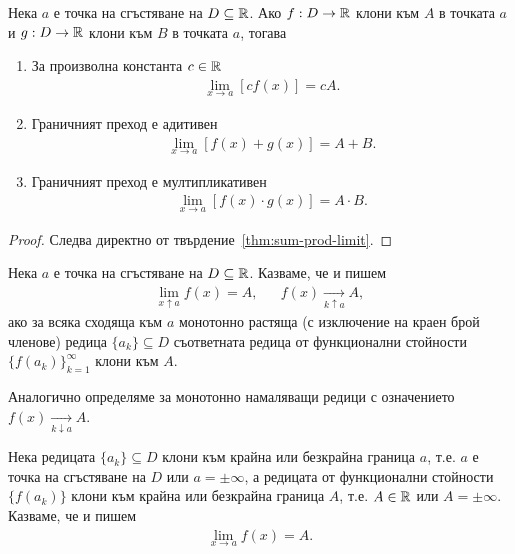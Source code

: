\documentclass[numbers=endperiod, bibliography=totocnumbered]{scrartcl}
\begin{document}
\begin{proposition}\label{thm:limit-linear-mult}
  Нека \( a \) е точка на сгъстяване на \( D \subseteq \mathbb{R} \). Ако \( f: D \to \mathbb{R} \) клони към \( A \) в точката \( a \) и \( g: D \to \mathbb{R} \) клони към \( B \) в точката \( a \), тогава
  \begin{enumerate}
    \item За произволна константа \( c \in \mathbb{R} \)
    \begin{align*}
      \lim_{x \to a} [c f(x)] = c A.
    \end{align*}

    \item Граничният преход е адитивен
    \begin{align*}
      \lim_{x \to a} [f(x) + g(x)] = A + B.
    \end{align*}

    \item Граничният преход е мултипликативен
    \begin{align*}
      \lim_{x \to a} [f(x) \cdot g(x)] = A \cdot B.
    \end{align*}
  \end{enumerate}
\end{proposition}
\begin{proof}
  Следва директно от твърдение~\ref{thm:sum-prod-limit}.
\end{proof}

\begin{definition}
  Нека \( a \) е точка на сгъстяване на \( D \subseteq \mathbb{R} \). Казваме, че  и пишем
  \begin{align*}
    \lim_{x \uparrow a} f(x) = A,
    &&
    f(x) \underset {k \uparrow a} \longrightarrow A,
  \end{align*}
  ако за всяка сходяща към \( a \) монотонно растяща (с изключение на краен брой членове) редица \( \{ a_k \} \subseteq D \) съответната редица от функционални стойности \( {\{ f(a_k) \}}_{k=1}^\infty \) клони към \( A \).

  Аналогично определяме  за монотонно намаляващи редици с означението \( f(x) \underset {k \downarrow a} \longrightarrow A \).
\end{definition}

\begin{definition}
  Нека редицата \( \{ a_k \} \subseteq D \) клони към крайна или безкрайна граница \( a \), т.е. \( a \) е точка на сгъстяване на \( D \) или \( a = \pm \infty \), а редицата от функционални стойности \( \{ f(a_k) \} \) клони към крайна или безкрайна граница \( A \), т.е. \( A \in \mathbb{R} \) или \( A = \pm \infty \). Казваме, че  и пишем
  \begin{align*}
    \lim_{x \to a} f(x) = A.
  \end{align*}
\end{definition}
\end{document}
